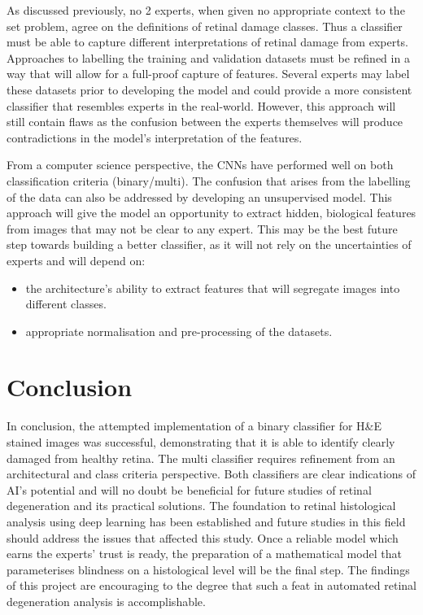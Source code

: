 \documentclass[a4paper]{article}
\begin{document}
    As discussed previously, no 2 experts, when given no appropriate context to the set problem, agree on the definitions of retinal damage classes. Thus a classifier must be able to capture different interpretations of retinal damage from experts. Approaches to labelling the training and validation datasets must be refined in a way that will allow for a full-proof  capture of features. Several experts may label these datasets prior to developing the model and could provide a more consistent classifier that resembles experts in the real-world. However, this approach will still contain flaws as the confusion between the experts themselves will produce contradictions in the model's interpretation of the features. 
    \vspace{3mm}

    From a computer science perspective, the CNNs have performed well on both classification criteria (binary/multi). The confusion that arises from the labelling of the data can also be addressed by developing an unsupervised model. This approach will give the model an opportunity to extract hidden, biological features from images that may not be clear to any expert. This may be the best future step towards building a better classifier, as it will not rely on the uncertainties of experts and will depend on:
    \begin{itemize}
        \item the architecture's ability to extract features that will segregate images into different classes.
        \item appropriate normalisation and pre-processing of the datasets.
    \end{itemize}        
    \vspace{3mm}

\newpage
\section{Conclusion}
In conclusion, the attempted implementation of a binary classifier for H\&E stained images was successful, demonstrating that it is able to identify clearly damaged from healthy retina. The multi classifier requires refinement from an architectural and class criteria perspective. Both classifiers are clear indications of AI's potential and will no doubt be beneficial for future studies of retinal degeneration and its practical solutions. The foundation to retinal histological analysis using deep learning has been established and future studies in this field should address the issues that affected this study. Once a reliable model which earns the experts' trust is ready, the preparation of a mathematical model that parameterises blindness on a histological level will be the final step. The findings of this project are encouraging to the degree that such a feat in automated retinal degeneration analysis is accomplishable.
\end{document}
